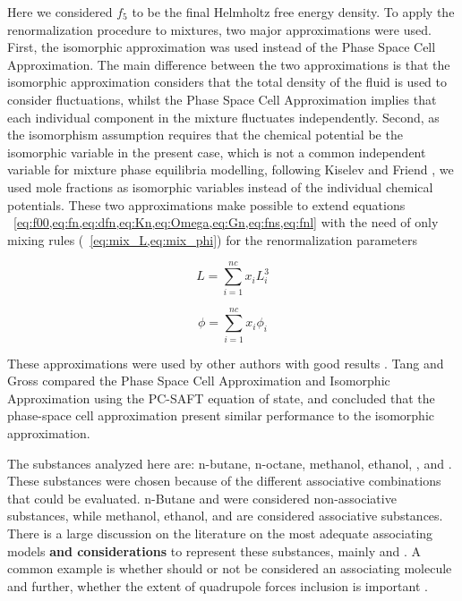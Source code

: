 \documentclass[preprint,12pt,3p]{elsarticle}
\begin{document}
    Here we considered $f_{5}$ to be the final Helmholtz free energy density. To apply the renormalization procedure to mixtures, two major approximations were used. First, the isomorphic approximation \cite{fisher1968renormalization} was used instead of the Phase Space Cell Approximation. The main difference between the two approximations is that the isomorphic approximation considers that the total density of the fluid is used to consider fluctuations, whilst the Phase Space Cell Approximation implies that each individual component in the mixture fluctuates independently. Second, as the isomorphism assumption requires that the chemical potential be the isomorphic variable in the present case, which is not a common independent variable for mixture phase equilibria modelling, following Kiselev and Friend \cite{kiselev1999cubic}, we used mole fractions as isomorphic variables instead of the individual chemical potentials. These two approximations make possible to extend equations ~\cref{eq:f00,eq:fn,eq:dfn,eq:Kn,eq:Omega,eq:Gn,eq:fns,eq:fnl} with the need of only mixing rules (~\cref{eq:mix_L,eq:mix_phi}) for the renormalization parameters
    
\begin{equation} \label{eq:mix_L}
    L = \sum_{i=1}^{nc}x_{i}L_{i}^{3}
\end{equation}

\begin{equation} \label{eq:mix_phi}
    \phi = \sum_{i=1}^{nc}x_{i}\phi_{i}
\end{equation}
    
    These approximations were used by other authors with good results \cite{cai2004thermodynamics,llovell2006global,sun2005application,pcm2017application,xu2011prediction}. Tang and Gross  \cite{tang2010renormalization} compared the Phase Space Cell Approximation and Isomorphic Approximation using the PC-SAFT equation of state, and concluded that the phase-space cell approximation present similar performance to the isomorphic approximation. 

    The substances analyzed here are: n-butane, n-octane, methanol, ethanol, , and . These substances were chosen because of the different associative combinations that could be evaluated. n-Butane and  were considered non-associative substances, while methanol, ethanol, and  are considered associative substances. There is a large discussion on the literature on the most adequate associating models \textbf{and considerations} to represent these substances, mainly   \cite{bjorner2016modeling} and   \cite{ruffine2006represent}. A common example is whether  should or not be considered an associating molecule and further, whether the extent of quadrupole forces inclusion is important \cite{tsivintzelis2011modeling,bjorner2016modeling}.
    
\end{document}
